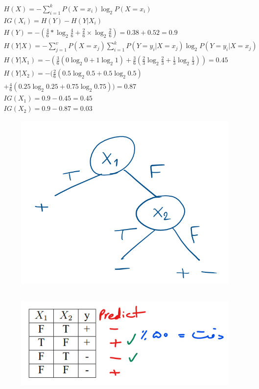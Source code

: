\documentclass{university}
\begin{document}
\subsection{}
\begin{gather*}
H(X) = -\sum_{i=1}^{k} P(X = x_i) \log_2 P(X = x_i) \\
IG(X_i) = H(Y) - H(Y|X_i) \\
H(Y) = -(\frac{4}{6} * \log_2 \frac{4}{6} + \frac{2}{6} \times \log_2 \frac{2}{6}) = 0.38 + 0.52 = 0.9 \\
H(Y|X) = -\sum_{j=1}^{v} P(X = x_j) \sum_{i=1}^{k} P(Y = y_i | X = x_j) \log_2 P(Y = y_i | X = x_j) \\
H(Y|X_1) = -(\frac{3}{6} (0 \log_2 0 + 1 \log_2 1) + \frac{3}{6} (\frac{2}{3} \log_2 \frac{2}{3} + \frac{1}{3} \log_2 \frac{1}{3})) = 0.45 \\
H(Y|X_2) = -(\frac{2}{6} (0.5 \log_2 0.5 + 0.5 \log_2 0.5) \\ 
+ \frac{4}{6} (0.25 \log_2 0.25 + 0.75 \log_2 0.75)) = 0.87 \\
IG(X_1) = 0.9 - 0.45 = 0.45 \\
IG(X_2) = 0.9 - 0.87 = 0.03 
\end{gather*}
\begin{figure}[H]
    \centering
    \includegraphics[width=\textwidth]{assets/3a.png}
\end{figure}

\subsection{}
\begin{figure}[H]
    \centering
    \includegraphics[width=\textwidth]{assets/3b.png}
\end{figure}
\end{document}
